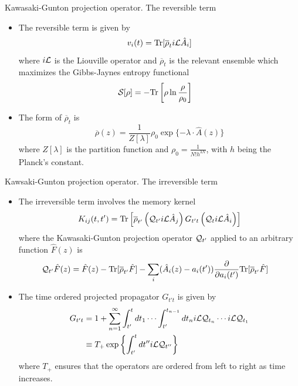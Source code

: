 \documentclass{beamer}
\begin{document}
\begin{frame}{Kawasaki-Gunton projection operator. The reversible term}
\begin{itemize}
  \item The reversible term is given by
\begin{equation}
  v_i(t) = {\rm Tr}[\overline{\rho}_t  i{\cal L} \hat{A}_i]
  \nonumber
\label{vit}
\end{equation}
where $i{\cal L}$ is the Liouville operator and $\overline{\rho}_t$ is the \alert{relevant ensemble} which maximizes the Gibbs-Jaynes entropy functional
\begin{align}
 {\cal S}[\rho]&=-{\rm Tr}\left[\rho\ln\frac{\rho}{\rho_0}\right]
\nonumber
\label{entropy}
\end{align}

\item The form of $\overline{\rho}_t$ is
\begin{equation}
\overline{\rho}(z) = \frac{1}{Z[\lambda]} \rho_0\exp\{-\lambda\!\cdot\!\hat{A}(z)\}
\nonumber
\end{equation}
where $Z[\lambda]$ is the partition function and $\rho_0=\frac{1}{N!h^{3N}}$,   with  $h$  being   the  Planck's constant.
\end{itemize}
\end{frame}

\begin{frame}{Kawsaki-Gunton projection operator. The irreversible term}
\begin{itemize}
    \item The irreversible
      term involves the \alert{memory kernel}
\begin{equation}
K_{ij}(t,t') =
{\rm Tr}\left[\overline{\rho}_{t'} 
  \left({\cal Q}_{t'} i{\cal L}\hat{A}_j\right) G_{t't}
\left({\cal Q}_{t } i{\cal L}\hat{A}_i\right)\right]
\nonumber
\label{ker}
\end{equation}
where   the  Kawasaki-Gunton   projection  operator   ${\cal  Q}_{t'}$
applied  to an  arbitrary  function
$\hat{F}(z)$ is
\begin{align}
  {\cal Q}_{t'}\hat{F}(z) &= \hat{F}(z)- {\rm Tr}[\overline{\rho}_{t'} \hat{F}]
-\sum_i(\hat{A}_i(z)-a_i(t'))\frac{\partial }{\partial a_i(t')}
{\rm Tr}[\overline{\rho}_{t'} \hat{F}]
\label{Q}
\nonumber
\end{align}

\item The time ordered projected propagator $G_{t't}$ is given by
\begin{align}
  G_{t't}&=1
+\sum_{n=1}^\infty \int_{t'}^tdt_1\cdots\int_{t'}^{t_{n-1}}dt_n
i{\cal L}{\cal Q}_{t_n}\cdots  i{\cal L}{\cal Q}_{t_1}
\nonumber\\
&\equiv T_+\exp\left\{\int_{t'}^t dt''  i{\cal L}{\cal Q}_{t''}\right\}
\nonumber
\end{align}
where $T_+$ ensures that the operators are ordered from left to right as time increases.
\end{itemize}
  
\end{frame}
\end{document}
